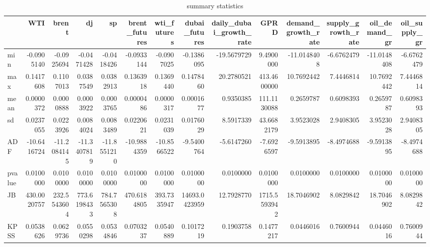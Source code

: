 \begin{table}
\centering
\caption{summary statistics}
\centering
\begin{tabular}[t]{l|r|r|r|r|r|r|r|r|r|r|r|r|r}
\hline
  & WTI & brent & dj & sp & brent\_futures & wti\_futures & dubai\_futures & daily\_dubai\_growth\_rate & GPRD & demand\_growth\_rate & supply\_growth\_rate & oil\_demand\_gr & oil\_supply\_gr\\
\hline
min & -0.0905140 & -0.0925694 & -0.0471428 & -0.0418426 & -0.0933144 & -0.0907025 & -0.1386095 & -19.5679729 & 9.4900000 & -11.0148408 & -6.6762479 & -11.0148408 & -6.6762479\\
\hline
max & 0.1417608 & 0.1107013 & 0.0387549 & 0.0382913 & 0.1363918 & 0.1369440 & 0.1478460 & 20.2780521 & 413.4600000 & 10.7692442 & 7.4446814 & 10.7692442 & 7.4446814\\
\hline
mean & 0.0000372 & 0.0000888 & 0.0003922 & 0.0003765 & 0.0000486 & 0.0000317 & 0.0001677 & 0.9350385 & 111.1130088 & 0.2659787 & 0.6098393 & 0.2659787 & 0.6098393\\
\hline
sd & 0.0237055 & 0.0223926 & 0.0084024 & 0.0083489 & 0.0220621 & 0.0231039 & 0.0176029 & 8.5917339 & 43.6682179 & 3.9523028 & 2.9408305 & 3.9523028 & 2.9408305\\
\hline
ADF & -10.6416724 & -11.2084145 & -11.3407819 & -11.8551210 & -10.9884359 & -10.8566522 & -9.5400764 & -5.6147260 & -7.6926597 & -9.5913895 & -8.4974688 & -9.5913895 & -8.4974688\\
\hline
pvalue & 0.0100000 & 0.0100000 & 0.0100000 & 0.0100000 & 0.0100000 & 0.0100000 & 0.0100000 & 0.0100000 & 0.0100000 & 0.0100000 & 0.0100000 & 0.0100000 & 0.0100000\\
\hline
JB & 430.0020757 & 232.5543604 & 773.6198433 & 784.7565308 & 470.6184805 & 393.7335947 & 14693.0423959 & 12.7928770 & 1715.5593942 & 18.7046902 & 8.0829842 & 18.7046902 & 8.0829842\\
\hline
KPSS & 0.0538626 & 0.0629736 & 0.0550298 & 0.0534846 & 0.0703237 & 0.0540889 & 0.1017219 & 0.1903758 & 0.1477217 & 0.0446016 & 0.7600944 & 0.0446016 & 0.7600944\\
\hline
\end{tabular}
\end{table}
